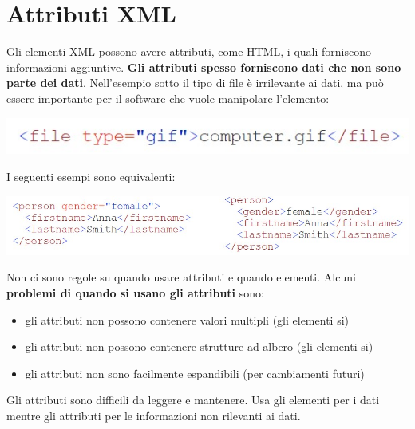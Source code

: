 \section{Attributi XML}
Gli elementi XML possono avere attributi, come HTML, i quali forniscono informazioni aggiuntive. \textbf{Gli attributi spesso forniscono dati che non sono parte dei dati}. Nell'esempio sotto il tipo di file è irrilevante ai dati, ma può essere importante per il software che vuole manipolare l'elemento:
\begin{center}
    \includegraphics[scale=0.4]{Images/TecnologieWeb/5/File.jpg}
\end{center}
I seguenti esempi sono equivalenti:
\begin{center}
    \includegraphics[scale=0.4]{Images/TecnologieWeb/5/Person.jpg}
\end{center}
Non ci sono regole su quando usare attributi e quando elementi. Alcuni \textbf{problemi di quando si usano gli attributi} sono:
\begin{itemize}
    \item gli attributi non possono contenere valori multipli (gli elementi si)
    \item gli attributi non possono contenere strutture ad albero (gli elementi si)
    \item gli attributi non sono facilmente espandibili (per cambiamenti futuri)
\end{itemize}
Gli attributi sono difficili da leggere e mantenere. Usa gli elementi per i dati mentre gli attributi per le informazioni non rilevanti ai dati. 

